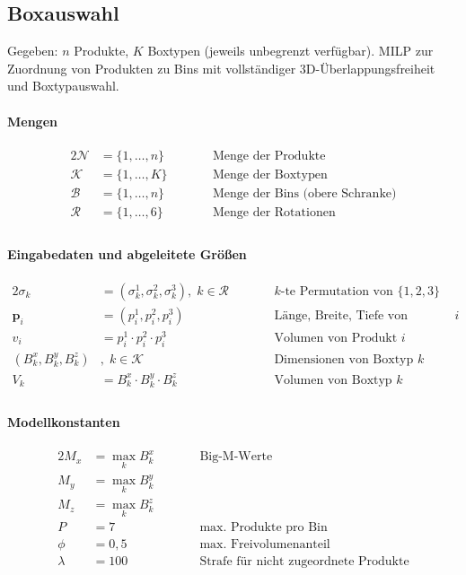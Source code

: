 \documentclass[10pt]{article}
\newcommand{\NN}{\mathcal{N}}
\newcommand{\R}{\mathcal{R}}
\newcommand{\BB}{\mathcal{B}}
\newcommand{\KK}{\mathcal{K}}
\begin{document}
\subsection{Boxauswahl}
\label{sec:boxauswahl}

Gegeben: $n$ Produkte, $K$ Boxtypen (jeweils unbegrenzt verf\"ugbar).
MILP zur Zuordnung von Produkten zu Bins mit vollst\"andiger
3D-\"Uberlappungsfreiheit und Boxtypauswahl.

\paragraph{Mengen}

\begin{alignat*}{2}
\NN &= \{1, \dots, n\}
  &\qquad& \text{Menge der Produkte} \\
\KK &= \{1, \dots, K\}
  && \text{Menge der Boxtypen} \\
\BB &= \{1, \dots, n\}
  && \text{Menge der Bins (obere Schranke)} \\
\R &= \{1, \dots, 6\}
  && \text{Menge der Rotationen} \\
\end{alignat*}

\paragraph{Eingabedaten und abgeleitete Gr\"o\ss en}

\begin{alignat*}{2}
\sigma_k &= (\sigma_k^1, \sigma_k^2, \sigma_k^3),\; k \in \R
  &\qquad& \text{$k$-te Permutation von $\{1,2,3\}$} \\
\mathbf{p}_i &= (p_i^1, p_i^2, p_i^3)
  && \text{L\"ange, Breite, Tiefe von Produkt $i$} \\
v_i &= p_i^1 \cdot p_i^2 \cdot p_i^3
  && \text{Volumen von Produkt $i$} \\
(B_k^x, B_k^y, B_k^z) &,\; k \in \KK
  && \text{Dimensionen von Boxtyp $k$} \\
V_k &= B_k^x \cdot B_k^y \cdot B_k^z
  && \text{Volumen von Boxtyp $k$} \\
\end{alignat*}

\paragraph{Modellkonstanten}

\begin{alignat*}{2}
M_x &= \max_k B_k^x
  &\qquad& \text{Big-M-Werte} \\
M_y &= \max_k B_k^y && \\
M_z &= \max_k B_k^z && \\
P &= 7
  && \text{max.\ Produkte pro Bin} \\
\phi &= 0{,}5
  && \text{max.\ Freivolumenanteil} \\
\lambda &= 100
  && \text{Strafe f\"ur nicht zugeordnete Produkte} \\
\end{alignat*}
\end{document}
